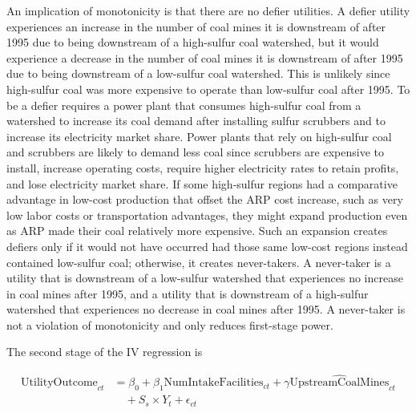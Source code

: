 \documentclass[12pt]{article}
\begin{document}
An implication of monotonicity is that there are no defier utilities. A defier utility experiences an increase in the number of coal mines it is downstream of after 1995 due to being downstream of a high-sulfur coal watershed, but it would experience a decrease in the number of coal mines it is downstream of after 1995 due to being downstream of a low-sulfur coal watershed. This is unlikely since high-sulfur coal was more expensive to operate than low-sulfur coal after 1995. To be a defier requires a power plant that consumes high-sulfur coal from a watershed to increase its coal demand after installing sulfur scrubbers and to increase its electricity market share. Power plants that rely on high-sulfur coal and scrubbers are likely to demand less coal since scrubbers are expensive to install, increase operating costs, require higher electricity rates to retain profits, and lose electricity market share. If some high-sulfur regions had a comparative advantage in low-cost production that offset the ARP cost increase, such as very low labor costs or transportation advantages, they might expand production even as ARP made their coal relatively more expensive. Such an expansion creates defiers only if it would not have occurred had those same low-cost regions instead contained low-sulfur coal; otherwise, it creates never-takers. A never-taker is a utility that is downstream of a low-sulfur watershed that experiences no increase in coal mines after 1995, and a utility that is downstream of a high-sulfur watershed that experiences no decrease in coal mines after 1995. A never-taker is not a violation of monotonicity and only reduces first-stage power. 


The second stage of the IV regression is

\begin{equation}\label{2ndstage2sls}
\begin{split}
\text{UtilityOutcome}_{ct} &= \beta_0 + \beta_1\text{NumIntakeFacilities}_{ct} + \gamma\widehat{\text{UpstreamCoalMines}}_{ct} \\
&\quad + S_s\times Y_t + \epsilon_{ct}
\end{split}
\end{equation}
\end{document}
